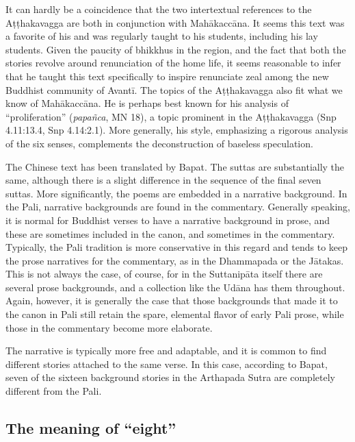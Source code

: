 \documentclass[12pt,openany]{book}%
\begin{document}
It can hardly be a coincidence that the two intertextual references to the \textsanskrit{Aṭṭhakavagga} are both in conjunction with \textsanskrit{Mahākaccāna}. It seems this text was a favorite of his and was regularly taught to his students, including his lay students. Given the paucity of bhikkhus in the region, and the fact that both the stories revolve around renunciation of the home life, it seems reasonable to infer that he taught this text specifically to inspire renunciate zeal among the new Buddhist community of \textsanskrit{Avantī}. The topics of the \textsanskrit{Aṭṭhakavagga} also fit what we know of \textsanskrit{Mahākaccāna}. He is perhaps best known for his analysis of “proliferation” (\textit{\textsanskrit{papañca}}, MN 18), a topic prominent in the \textsanskrit{Aṭṭhakavagga} (Snp 4.11:13.4, Snp 4.14:2.1). More generally, his style, emphasizing a rigorous analysis of the six senses, complements the deconstruction of baseless speculation.

The Chinese text has been translated by Bapat. The suttas are substantially the same, although there is a slight difference in the sequence of the final seven suttas. More significantly, the poems are embedded in a narrative background. In the Pali, narrative backgrounds are found in the commentary. Generally speaking, it is normal for Buddhist verses to have a narrative background in prose, and these are sometimes included in the canon, and sometimes in the commentary. Typically, the Pali tradition is more conservative in this regard and tends to keep the prose narratives for the commentary, as in the Dhammapada or the \textsanskrit{Jātakas}. This is not always the case, of course, for in the \textsanskrit{Suttanipāta} itself there are several prose backgrounds, and a collection like the \textsanskrit{Udāna} has them throughout. Again, however, it is generally the case that those backgrounds that made it to the canon in Pali still retain the spare, elemental flavor of early Pali prose, while those in the commentary become more elaborate.

The narrative is typically more free and adaptable, and it is common to find different stories attached to the same verse. In this case, according to Bapat, seven of the sixteen background stories in the Arthapada Sutra are completely different from the Pali.

\subsection*{The meaning of “eight”}
\end{document}
